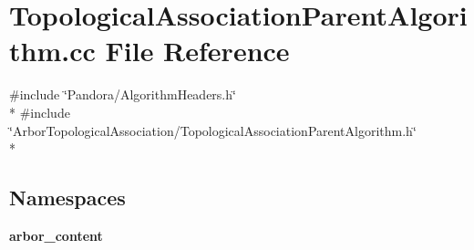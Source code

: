 \section{Topological\+Association\+Parent\+Algorithm.\+cc File Reference}
\label{TopologicalAssociationParentAlgorithm_8cc}
{\ttfamily \#include \char`\"{}Pandora/\+Algorithm\+Headers.\+h\char`\"{}}\\*
{\ttfamily \#include \char`\"{}Arbor\+Topological\+Association/\+Topological\+Association\+Parent\+Algorithm.\+h\char`\"{}}\\*
\subsection*{Namespaces}
\begin{DoxyCompactItemize}
\item 
 {\bf arbor\+\_\+content}
\end{DoxyCompactItemize}
